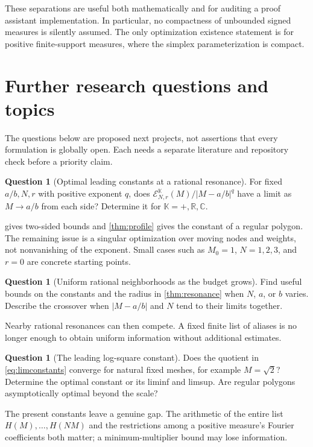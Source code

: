\documentclass[11pt,a4paper]{article}
\numberwithin{equation}{section}
\theoremstyle{plain}
\theoremstyle{definition}
\newtheorem{question}[theorem]{Question}
\theoremstyle{remark}
\newcommand{\R}{\mathbb R}\newcommand{\C}{\mathbb C}
\newcommand{\Err}{\mathcal E}
\begin{document}
These separations are useful both mathematically and for auditing a proof
assistant implementation. In particular, no compactness of unbounded signed
measures is silently assumed. The only optimization existence statement is
for positive finite-support measures, where the simplex parameterization is
compact.

\section{Further research questions and topics}
\label{sec:future}

The questions below are proposed next projects, not assertions that every
formulation is globally open. Each needs a separate literature and repository
check before a priority claim.

\begin{question}[Optimal leading constants at a rational resonance]
For fixed $a/b,N,r$ with positive exponent $q$, does
$\Err^{\mathbb K}_{N,r}(M)/|M-a/b|^q$ have a limit as $M\to a/b$ from each
side? Determine it for $\mathbb K=+,\R,\C$.
\end{question}
 gives two-sided bounds and \cref{thm:profile} gives the
constant of a regular polygon. The remaining issue is a singular optimization
over moving nodes and weights, not nonvanishing of the exponent. Small cases
such as $M_0=1$, $N=1,2,3$, and $r=0$ are concrete starting points.

\begin{question}[Uniform rational neighborhoods as the budget grows]
Find useful bounds on the constants and the radius in
\cref{thm:resonance} when $N$, $a$, or $b$ varies. Describe the crossover when
$|M-a/b|$ and $N$ tend to their limits together.
\end{question}
Nearby rational resonances can then compete. A fixed finite list of aliases
is no longer enough to obtain uniform information without additional estimates.

\begin{question}[The leading log-square constant]
Does the quotient in \eqref{eq:limconstants} converge for natural fixed meshes,
for example $M=\sqrt2$? Determine the optimal constant or its liminf and
limsup. Are regular polygons asymptotically optimal beyond the scale?
\end{question}
The present constants leave a genuine gap. The arithmetic of the entire list
$H(M),\ldots,H(NM)$ and the restrictions among a positive measure's Fourier
coefficients both matter; a minimum-multiplier bound may lose information.
\end{document}
